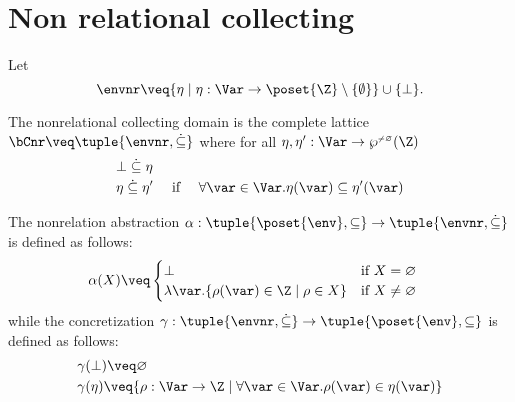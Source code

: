 \chapter{Non relational collecting}

Let \[\envnr \veq \{\eta \mid \eta: \Var \to \poset{\Z}\setminus
\{\emptyset\}\} \cup \{\bot\}.\]

The nonrelational collecting domain is the complete lattice \(\bCnr
\veq \tuple{\envnr,\dot{\subseteq}}\) where for all \(\eta,\eta':\Var
\to \wp^{\scriptscriptstyle\neq \varnothing}(\Z)\)
\begin{align*}
  &\bot \mathrel{\dot{\subseteq}} \eta\\
  & \eta \mathrel{\dot{\subseteq}} \eta' \quad\text{ if }\quad \forall \var\in \Var. \eta(\var)\subseteq \eta'(\var)
\end{align*}

The nonrelation abstraction \(\alpha: \tuple{\poset{\env},\subseteq}
\to \tuple{\envnr,\dot{\subseteq}}\) is defined as follows:
\begin{align*}
  &\alpha(X) \veq 
  \begin{cases}
    \bot & \text{if }X=\varnothing\\
    \lambda \var. \{\rho(\var) \in \Z \mid \rho \in X\} &\text{if }X\neq \varnothing\\
  \end{cases}
\end{align*}
while the concretization \(\gamma: \tuple{\envnr,\dot{\subseteq}} \to
\tuple{\poset{\env},\subseteq}\) is defined as follows:
\begin{align*}
  &\gamma(\bot) \veq \varnothing\\
  &\gamma(\eta) \veq \{\rho : \Var \to \Z \mid \forall \var \in \Var. \rho(\var)\in \eta(\var)\}
\end{align*}
